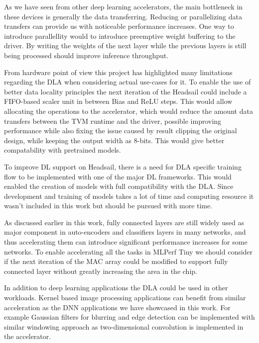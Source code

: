 \documentclass[12pt,a4paper,english
]{tunithesis}
\begin{document}
As we have seen from other deep learning accelerators, the main bottleneck in these devices is generally the data transferring. Reducing or parallelizing data transfers can provide us with noticeable performance increases. One way to introduce parallellity would to introduce preemptive weight buffering to the driver. By writing the weights of the next layer while the previous layers is still being processed should improve inference throughput.

From hardware point of view this project has highlighted many limitations regarding the DLA when considering actual use-cases for it. To enable the use of better data locality principles the next iteration of the Headsail could include a FIFO-based scaler unit in between Bias and ReLU steps. This would allow allocating the  operations to the accelerator, which would reduce the amount data transfers between the TVM runtime and the driver, possible improving performance while also fixing the issue caused by result clipping the original design, while keeping the output width as 8-bits. This would give better compatability with pretrained models.

To improve DL support on Headsail, there is a need for DLA specific training flow to be implemented with one of the major DL frameworks. This would enabled the creation of models with full compatibility with the DLA. Since development and training of models takes a lot of time and computing resource it wasn't included in this work but should be pursued with more time.

As discussed earlier in this work, fully connected layers are still widely used as major component in auto-encoders and classifiers layers in many networks, and thus accelerating them can introduce significant performance increases for some networks. To enable accelerating all the tasks in MLPerf Tiny we should consider if the next iteration of the MAC array could be modified to support fully connected layer without greatly increasing the area in the chip.

In addition to deep learning applications the DLA could be used in other workloads. Kernel based image processing applications can benefit from similar acceleration as the DNN applications we have showcased in this work. For example Gaussian filters for blurring and edge detection can be implemented with similar windowing approach as two-dimensional convolution is implemented in the accelerator.



%
%
\newpage
\end{document}
